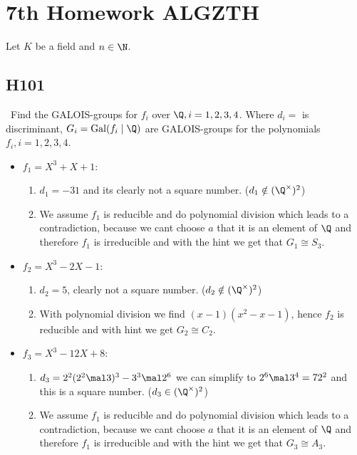 
\section{7th Homework ALGZTH}
Let $K$ be a field and $n \in \N$.
\subsection{H101}
\begin{solution}\
	Find the GALOIS-groups for $f_i$ over $\Q,i=1,2,3,4$. Where $d_i=$ is discriminant, $G_i=\Gal(f_i\mid \Q)$ are  GALOIS-groups for the polynomials $f_i,i=1,2,3,4$.
	\begin{itemize}
		\item $f_1 = X^3 + X + 1$:
		\begin{enumerate}
			\item $d_1=-31$ and its clearly not a square number. ($d_1 \notin (\Q^{\times})^2$)
			\item We assume $f_1$ is reducible and do polynomial division which leads to a contradiction, because we cant choose $a$ that it is an element of $\Q$ and therefore $f_1$ is irreducible and with the hint we get that $G_1 \cong S_3$.
		\end{enumerate}
		\item $f_2 = X^3 - 2X - 1$:
		\begin{enumerate}
			\item $d_2=5$, clearly not a square number. ($d_2 \notin (\Q^{\times})^2$)
			\item With polynomial division we find $(x-1)(x^2-x-1)$, hence $f_2$ is reducible and with hint we get $G_2 \cong C_2$.
		\end{enumerate}
		\item $f_3 = X^3 - 12X + 8$:
		\begin{enumerate}
			\item $d_3 = 2^2(2^2\mal 3)^3 - 3^3 \mal 2^6$ we can simplify to $2^6\mal 3^4 = 72^2$ and this is a square number. ($d_3 \in (\Q^{\times})^2$)
			\item We assume $f_1$ is reducible and do polynomial division which leads to a contradiction, because we cant choose $a$ that it is an element of $\Q$ and therefore $f_1$ is irreducible and with the hint we get that $G_3 \cong A_3$.

\end{enumerate}
\end{itemize}
\end{solution}
